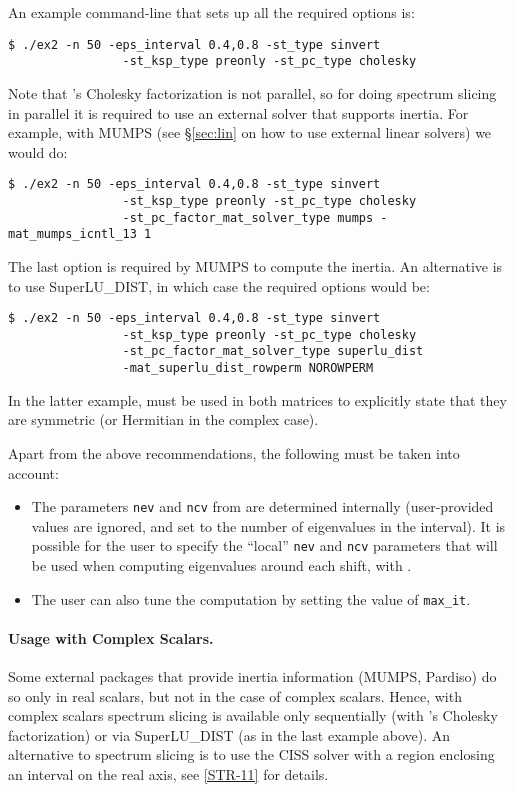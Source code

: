 An example command-line that sets up all the required options is:
\begin{Verbatim}[fontsize=\small]
	$ ./ex2 -n 50 -eps_interval 0.4,0.8 -st_type sinvert
                -st_ksp_type preonly -st_pc_type cholesky
\end{Verbatim}

Note that \petsc's Cholesky factorization is not parallel, so for doing spectrum slicing in parallel it is required to use an external solver that supports inertia. For example, with MUMPS (see \S\ref{sec:lin} on how to use external linear solvers) we would do:
\begin{Verbatim}[fontsize=\small]
	$ ./ex2 -n 50 -eps_interval 0.4,0.8 -st_type sinvert
                -st_ksp_type preonly -st_pc_type cholesky
                -st_pc_factor_mat_solver_type mumps -mat_mumps_icntl_13 1
\end{Verbatim}
The last option is required by MUMPS to compute the inertia. An alternative is to use SuperLU\_DIST, in which case the required options would be:
\begin{Verbatim}[fontsize=\small]
	$ ./ex2 -n 50 -eps_interval 0.4,0.8 -st_type sinvert
                -st_ksp_type preonly -st_pc_type cholesky
                -st_pc_factor_mat_solver_type superlu_dist
                -mat_superlu_dist_rowperm NOROWPERM
\end{Verbatim}
In the latter example,  must be used in both matrices to explicitly state that they are symmetric (or Hermitian in the complex case).

Apart from the above recommendations, the following must be taken into account:
\begin{itemize}
\setlength{\itemsep}{0pt}
\item The parameters \texttt{nev} and \texttt{ncv} from  are determined internally (user-provided values are ignored, and set to the number of eigenvalues in the interval). It is possible for the user to specify the ``local'' \texttt{nev} and \texttt{ncv} parameters that will be used when computing eigenvalues around each shift, with .
\item The user can also tune the computation by setting the value of \texttt{max\_it}.
\end{itemize}

\paragraph{Usage with Complex Scalars.}
Some external packages that provide inertia information (MUMPS, Pardiso) do so only in real scalars, but not in the case of complex scalars. Hence, with complex scalars spectrum slicing is available only sequentially (with \petsc's Cholesky factorization) or via SuperLU\_DIST (as in the last example above). An alternative to spectrum slicing is to use the CISS solver with a region enclosing an interval on the real axis, see \hyperlink{str}{[STR-11]} for details.

